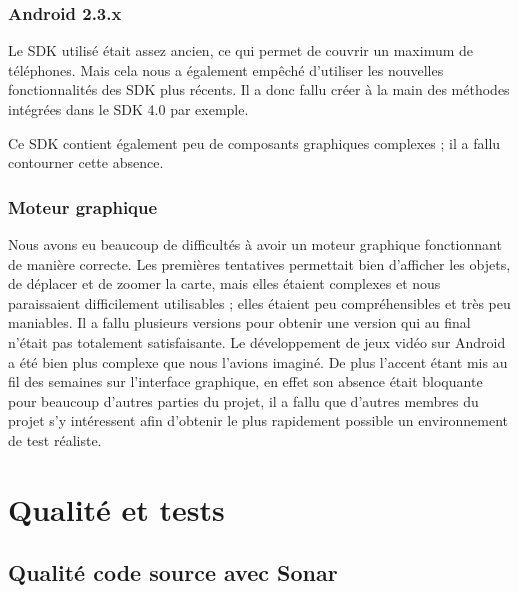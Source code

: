 \documentclass{report}
\begin{document}
\subsubsection{Android 2.3.x}

Le SDK utilisé était assez ancien, ce qui permet de couvrir un maximum
de téléphones. Mais cela nous a également empêché d’utiliser les
nouvelles  fonctionnalités des SDK plus récents. Il a donc fallu créer
à la main des méthodes intégrées dans le SDK 4.0 par exemple.

Ce SDK contient également peu de composants graphiques complexes ; il a
fallu contourner cette absence.

\subsubsection{Moteur graphique}

Nous avons eu beaucoup de difficultés à avoir un moteur graphique
fonctionnant de manière correcte. Les premières tentatives permettait
bien d’afficher les objets, de déplacer et de zoomer la carte, mais
elles étaient complexes et nous paraissaient difficilement utilisables ;
elles étaient peu compréhensibles et très peu maniables. Il a fallu
plusieurs versions pour obtenir une version qui au final n’était pas
totalement satisfaisante. Le développement de jeux vidéo sur Android a
été bien plus complexe que nous l’avions imaginé. De plus l’accent étant
mis au fil des semaines sur l’interface graphique, en effet son absence
était bloquante pour beaucoup d’autres parties du projet, il a fallu que
d’autres membres du projet s’y intéressent afin d’obtenir le plus
rapidement possible un environnement de test réaliste.
\newpage

\newpage

\section{Qualité et tests}
\bigskip


\subsection{Qualité code source avec Sonar}
\bigskip
\end{document}
